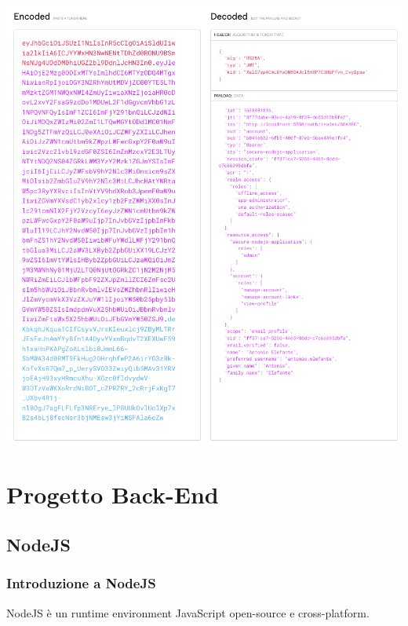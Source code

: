 \documentclass[twoside]{report}
\begin{document}
\bigbreak

\begin{minipage}{\linewidth}
    \vspace{2mm}
    \centering
    \includegraphics[width= \linewidth]{17.png}
    \vspace{2mm}
\end{minipage} 

\chapter{Progetto Back-End}
\thispagestyle{empty} 
\graphicspath{ {../progetto/images/nodejs/} }
\section{NodeJS}
\subsection{Introduzione a NodeJS}

NodeJS è un runtime environment JavaScript open-source e cross-platform.
\end{document}
